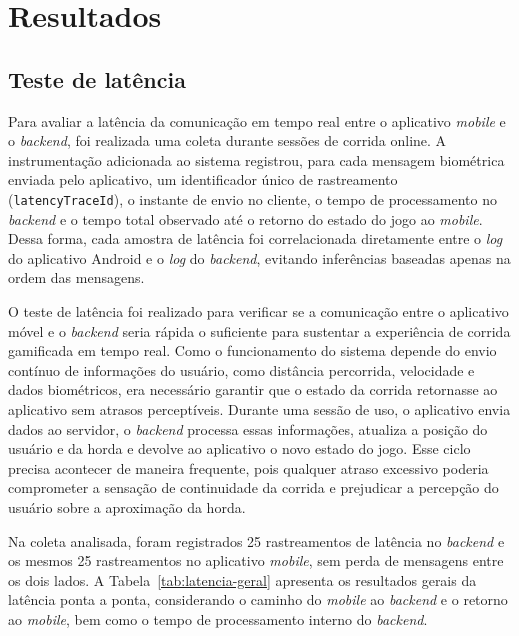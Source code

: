 \section{Resultados}

\subsection{Teste de latência}

Para avaliar a latência da comunicação em tempo real entre o aplicativo \textit{mobile} e o \textit{backend}, foi realizada uma coleta durante sessões de corrida online. A instrumentação adicionada ao sistema registrou, para cada mensagem biométrica enviada pelo aplicativo, um identificador único de rastreamento (\texttt{latencyTraceId}), o instante de envio no cliente, o tempo de processamento no \textit{backend} e o tempo total observado até o retorno do estado do jogo ao \textit{mobile}. Dessa forma, cada amostra de latência foi correlacionada diretamente entre o \textit{log} do aplicativo Android e o \textit{log} do \textit{backend}, evitando inferências baseadas apenas na ordem das mensagens.

O teste de latência foi realizado para verificar se a comunicação entre o aplicativo móvel e o \textit{backend} seria rápida o suficiente para sustentar a experiência de corrida gamificada em tempo real. Como o funcionamento do sistema depende do envio contínuo de informações do usuário, como distância percorrida, velocidade e dados biométricos, era necessário garantir que o estado da corrida retornasse ao aplicativo sem atrasos perceptíveis. Durante uma sessão de uso, o aplicativo envia dados ao servidor, o \textit{backend} processa essas informações, atualiza a posição do usuário e da horda e devolve ao aplicativo o novo estado do jogo. Esse ciclo precisa acontecer de maneira frequente, pois qualquer atraso excessivo poderia comprometer a sensação de continuidade da corrida e prejudicar a percepção do usuário sobre a aproximação da horda.

Na coleta analisada, foram registrados 25 rastreamentos de latência no \textit{backend} e os mesmos 25 rastreamentos no aplicativo \textit{mobile}, sem perda de mensagens entre os dois lados. A Tabela~\ref{tab:latencia-geral} apresenta os resultados gerais da latência ponta a ponta, considerando o caminho do \textit{mobile} ao \textit{backend} e o retorno ao \textit{mobile}, bem como o tempo de processamento interno do \textit{backend}.

